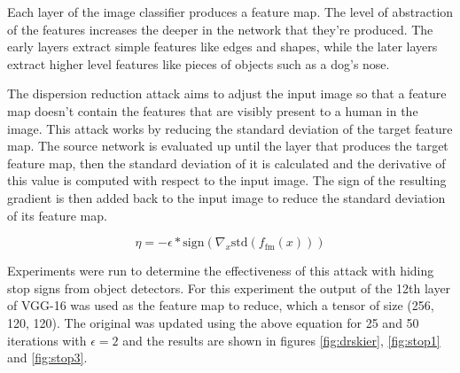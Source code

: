\documentclass{article}
\begin{document}
Each layer of the image classifier produces a feature map. The level of abstraction of the features increases the deeper in the network that they're produced. The early layers extract simple features like edges and shapes, while the later layers extract higher level features like pieces of objects such as a dog's nose. \cite{olah2017feature}

The dispersion reduction attack aims to adjust the input image so that a feature map doesn't contain the features that are visibly present to a human in the image. This attack works by reducing the standard deviation of the target feature map. The source network is evaluated up until the layer that produces the target feature map, then the standard deviation of it is calculated and the derivative of this value is computed with respect to the input image. The sign of the resulting gradient is then added back to the input image to reduce the standard deviation of its feature map.

\begin{equation}
    \eta = - \epsilon * \text{sign}(\nabla_x \text{std}(f_{\text{fm}}(x)))
\end{equation}

Experiments were run to determine the effectiveness of this attack with hiding stop signs from object detectors. For this experiment the output of the 12th layer of VGG-16 was used as the feature map to reduce, which a tensor of size (256, 120, 120). The original was updated using the above equation for 25 and 50 iterations with $\epsilon = 2$ and the results are shown in figures \ref{fig:drskier}, \ref{fig:stop1} and \ref{fig:stop3}.
\end{document}
